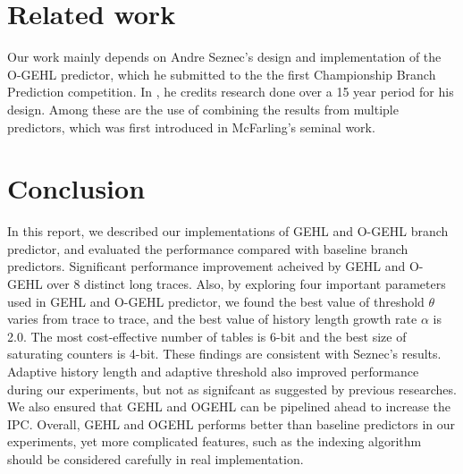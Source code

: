 \section{Related work}
Our work mainly depends on Andre Seznec's design and implementation of the O-GEHL predictor, which he submitted to the the first Championship Branch Prediction competition.\cite{seznec2005analysis}\cite{cbp1}\cite{ogehl} In \cite{seznec2005analysis}, he credits research done over a 15 year period for his design.  Among these are the use of combining the results from multiple predictors, which was first introduced in McFarling's seminal work.\cite{mcfarling1993combining}

\section {Conclusion}
In this report, we described our implementations of GEHL and O-GEHL branch predictor, and evaluated the performance compared with baseline branch predictors. Significant performance improvement acheived by GEHL and O-GEHL over 8 distinct long traces. Also, by exploring four important parameters used in GEHL and O-GEHL predictor, we found the best value of threshold $\theta$ varies from trace to trace, and the best value of history length growth rate $\alpha$ is 2.0. The most cost-effective number of tables is 6-bit and the best size of saturating counters is 4-bit. These findings are consistent with Seznec's results. Adaptive history length and adaptive threshold also improved performance during our experiments, but not as signifcant as suggested by previous researches. We also ensured that GEHL and  OGEHL can be pipelined ahead to increase the IPC. Overall, GEHL and OGEHL performs better than baseline predictors in our experiments, yet more complicated features, such as the indexing algorithm should be considered carefully in real implementation.
